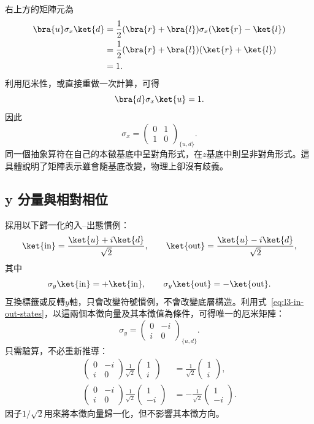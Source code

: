 右上方的矩陣元為
\begin{align}
\bra{u}\sigma_x\ket{d}
 &=\frac12(\bra{r}+\bra{l})\sigma_x(\ket{r}-\ket{l})\\
 &=\frac12(\bra{r}+\bra{l})(\ket{r}+\ket{l})\\
 &=1.
\end{align}
利用厄米性，或直接重做一次計算，可得
\[
\bra{d}\sigma_x\ket{u}=1.
\]
因此
\begin{equation}
\boxed{
\sigma_x=
\begin{pmatrix}
0&1\\
1&0
\end{pmatrix}_{\{u,d\}}.}
\label{eq:sigma-x}
\end{equation}
同一個抽象算符在自己的本徵基底中呈對角形式，在\(z\)基底中則呈非對角形式。這具體說明了矩陣表示雖會隨基底改變，物理上卻沒有歧義。

\subsection{y 分量與相對相位}

採用以下歸一化的入--出態慣例：
\begin{equation}
\ket{\mathrm{in}}=\frac{\ket{u}+i\ket{d}}{\sqrt2},
\qquad
\ket{\mathrm{out}}=\frac{\ket{u}-i\ket{d}}{\sqrt2},
\label{eq:l3-in-out-states}
\end{equation}
其中
\[
\sigma_y\ket{\mathrm{in}}=+\ket{\mathrm{in}},
\qquad
\sigma_y\ket{\mathrm{out}}=-\ket{\mathrm{out}}.
\]
互換標籤或反轉\(y\)軸，只會改變符號慣例，不會改變底層構造。利用式~\eqref{eq:l3-in-out-states}，以這兩個本徵向量及其本徵值為條件，可得唯一的厄米矩陣：
\begin{equation}
\boxed{
\sigma_y=
\begin{pmatrix}
0&-i\\
i&0
\end{pmatrix}_{\{u,d\}}.}
\label{eq:sigma-y}
\end{equation}
只需驗算，不必重新推導：
\begin{align}
\begin{pmatrix}0&-i\\i&0\end{pmatrix}
\frac1{\sqrt2}\begin{pmatrix}1\\i\end{pmatrix}
&=\frac1{\sqrt2}\begin{pmatrix}1\\i\end{pmatrix},\\
\begin{pmatrix}0&-i\\i&0\end{pmatrix}
\frac1{\sqrt2}\begin{pmatrix}1\\-i\end{pmatrix}
&=-\frac1{\sqrt2}\begin{pmatrix}1\\-i\end{pmatrix}.
\end{align}
因子\(1/\sqrt2\)用來將本徵向量歸一化，但不影響其本徵方向。

